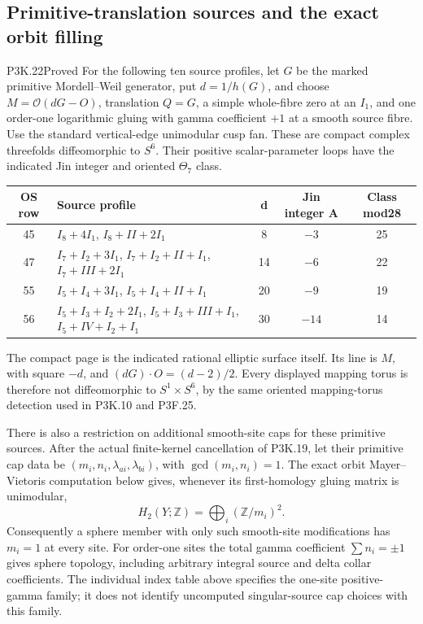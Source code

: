 \subsection{Primitive-translation sources and the exact orbit filling}

\begin{statement}{P3K.22}{Proved}
For the following ten source profiles, let \(G\) be the marked
primitive Mordell--Weil generator, put \(d=1/h(G)\), and choose
\(M=\mathcal O(dG-O)\), translation \(Q=G\), a simple whole-fibre
zero at an \(I_1\), and one order-one logarithmic gluing with gamma
coefficient \(+1\) at a smooth source fibre.  Use the standard
vertical-edge unimodular cusp fan.  These are compact complex
threefolds diffeomorphic to \(S^6\).  Their positive scalar-parameter
loops have the indicated Jin integer and oriented \(\Theta_7\) class.


\begin{center}\small\begin{tabular}{c p{} c c c}\hline
OS row & Source profile & d & Jin integer A & Class mod28 \\
\hline
45 & \(I_8+4I_1\), \(I_8+II+2I_1\) & 8 & \(-3\) & 25 \\
47 & \(I_7+I_2+3I_1\), \(I_7+I_2+II+I_1\), \(I_7+III+2I_1\) & 14 & \(-6\) & 22 \\
55 & \(I_5+I_4+3I_1\), \(I_5+I_4+II+I_1\) & 20 & \(-9\) & 19 \\
56 & \(I_5+I_3+I_2+2I_1\), \(I_5+I_3+III+I_1\), \(I_5+IV+I_2+I_1\) & 30 & \(-14\) & 14 \\
\hline\end{tabular}\end{center}

The compact page is the indicated rational elliptic surface itself.
Its line is \(M\), with square \(-d\), and
\((dG)\cdot O=(d-2)/2\).  Every displayed mapping torus is therefore
not diffeomorphic to \(S^1\times S^6\), by the same oriented
mapping-torus detection used in P3K.10 and P3F.25.

There is also a restriction on additional smooth-site caps for these
primitive sources.  After the actual finite-kernel cancellation of
P3K.19, let their primitive cap data be
\((m_i,n_i,\lambda_{ai},\lambda_{bi})\), with
\(\gcd(m_i,n_i)=1\).  The exact orbit Mayer--Vietoris computation
below gives, whenever its first-homology gluing matrix is unimodular,
\[
        H_2(Y;\mathbb Z)=\bigoplus_i(\mathbb Z/m_i)^2.       \tag{P3K.22.1}
\]
Consequently a sphere member with only such smooth-site modifications
has \(m_i=1\) at every site.  For order-one sites the total gamma
coefficient \(\sum n_i=\pm1\) gives sphere topology, including
arbitrary integral source and delta collar coefficients.  The
individual index table above specifies the one-site positive-gamma
family; it does not identify uncomputed singular-source cap choices
with this family.
\end{statement}

